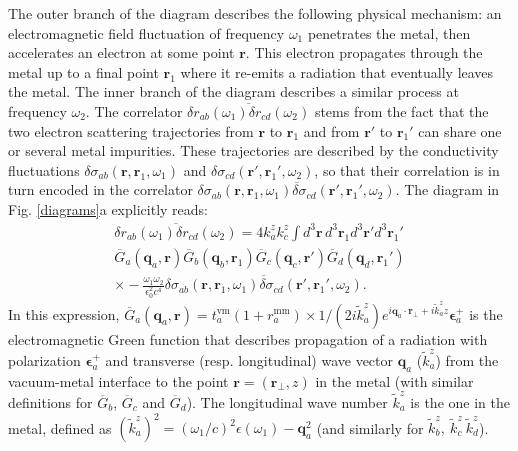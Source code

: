 \documentclass[doublecol]{epl2}
\newcommand{\bs}[1]{{\boldsymbol{#1}}}
\newcommand{\bq}{\bs{q}}
\newcommand{\be}{\bs{\epsilon}}
\begin{document}
The outer branch of the diagram describes the following physical mechanism: an electromagnetic field fluctuation of frequency $\omega_1$ penetrates the metal, then accelerates an electron at some point $\textbf{r}$. This electron propagates through the metal up to a final point $\textbf{r}_1$ 
where it re-emits a radiation that eventually leaves the metal. The inner branch of the diagram describes a similar process at frequency $\omega_2$.
The correlator $\overline{\delta r_{ab}(\omega_1)\delta r_{cd}(\omega_2)}$ stems from the fact that the two electron scattering trajectories from $\textbf{r}$ to $\textbf{r}_1$ and from $\textbf{r}'$ to $\textbf{r}_1'$ can share one or several metal impurities. These trajectories are described by the conductivity fluctuations $\delta \sigma_{ab}(\textbf{r}, \textbf{r}_1,\omega_1)$ and $\delta \sigma_{cd}(\textbf{r}', \textbf{r}_1',\omega_2)$, so that their correlation is in turn encoded in the  correlator $\overline{\delta \sigma_{ab}(\textbf{r},\textbf{r}_1,\omega_1)\delta \sigma_{cd}(\textbf{r}',\textbf{r}_1',\omega_2)}$. The diagram in Fig. \ref{diagrams}a  explicitly reads:
\begin{equation}
\begin{split}
\overline{\delta r_{ab}(\omega_1)\delta r_{cd}(\omega_2)}=
4 k_a^z k_c^z
 \int  d^3\textbf{r}\, d^3\textbf{r}_1d^3\textbf{r}'d^3\textbf{r}_1'\\
\overline{G}_{\!a}(\bq_a,\textbf{r})
 \overline{G}_{b}(\bq_b,\textbf{r}_1)\overline{G}_{c}(\bq_c,\textbf{r}')\overline{G}_{d}(\bq_d,\textbf{r}_1')\\
\times
-\frac{\omega_1\omega_2}{\epsilon_0^2c^4}\overline{\delta \sigma_{ab}(\textbf{r},\textbf{r}_1,\omega_1)\delta \sigma_{cd}(\textbf{r}',\textbf{r}_1',\omega_2)}.
\label{dr_dr_def}
\end{split}
\end{equation}
In this expression, $\overline{G}_a(\bq_a,\textbf{r})=t_a^\text{vm}(1+r_a^\text{mm})\times 1/(2i \tilde{k}_a^z)e^{i\bq_a\cdot \textbf{r}_\perp+i \tilde{k}_a^z z}\be_a^+$ is the electromagnetic Green function that describes propagation of a radiation with polarization $\be_a^+$ and transverse (resp. longitudinal) wave vector $\bq_a$ ($\tilde{k}_a^z$) from the vacuum-metal interface to the point $\textbf{r}=(\textbf{r}_\perp, z)$ in the metal (with similar definitions for $\overline{G}_b$, $\overline{G}_c$ and $\overline{G}_d$). 
The longitudinal wave number $\tilde{k}_a^z$ is the one in the metal, defined as $(\tilde{k}_a^z)^2=(\omega_1/c)^2\epsilon(\omega_1)-\bq_a^2$ (and similarly for $\tilde{k}_b^z,\ \tilde{k}_c^z\ \tilde{k}_d^z$).
\end{document}
